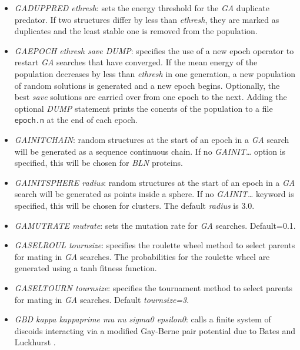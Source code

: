 \documentclass[12pt,a4paper,dvips]{article}
\begin{document}
\begin{itemize}
\item {\it GADUPPRED ethresh\/}: sets the energy threshold for the {\it GA}
duplicate predator. If two structures differ by less than {\it ethresh\/}, they are marked as duplicates and the least stable one is
removed from the population.

\item {\it GAEPOCH ethresh save DUMP\/}: specifies the use of a new epoch
operator to restart {\it GA} searches that have converged. If the mean energy of
the population decreases by less than {\it ethresh} in one generation, a new
population of random solutions is generated and a new epoch begins. Optionally,
the best {\it save} solutions are carried over from one epoch to the next.
Adding the optional {\it DUMP} statement prints the conents of the population to
a file {\tt epoch.n} at the end of each epoch.

\item {\it GAINITCHAIN\/}: random structures at the start of an epoch
in a {\it GA} search will be generated as a sequence continuous chain. If
no {\it GAINIT\ldots} option is specified, this will be chosen for {\it BLN}
proteins.

\item {\it GAINITSPHERE radius\/}: random structures at the start of an epoch
in a {\it GA} search will be generated as points inside a sphere.  If
no {\it GAINIT\ldots} keyword is specified, this will be chosen for clusters.
The default {\it radius\/} is 3.0.

\item {\it GAMUTRATE mutrate\/}: sets the mutation rate for {\it GA}
searches. Default=0.1.

\item {\it GASELROUL tournsize\/}: specifies the roulette wheel method to select
parents for mating in {\it GA} searches. The probabilities for the roulette
wheel are generated using a tanh fitness function.

\item {\it GASELTOURN tournsize\/}: specifies the tournament method to select
parents for mating in {\it GA} searches. Default {\it tournsize=3\/}.

\item {\it GBD kappa kappaprime mu nu sigma0 epsilon0\/}: calls a finite system of discoids
interacting via a modified Gay-Berne pair potential due to Bates and Luckhurst \cite{BatesL96}.


\end{itemize}
\end{document}

